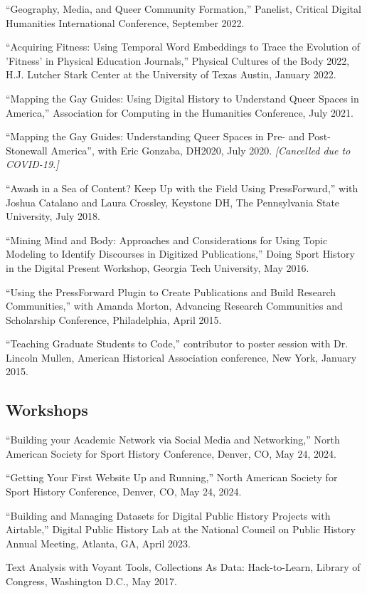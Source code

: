 \documentclass[11pt]{article}
\begin{document}
``Geography, Media, and Queer Community Formation,'' Panelist, Critical Digital Humanities International Conference, September 2022.

``Acquiring Fitness: Using Temporal Word Embeddings to Trace the Evolution of 'Fitness' in Physical Education Journals,'' Physical Cultures of the Body 2022, H.J. Lutcher Stark Center at the University of Texas Austin, January 2022.

``Mapping the Gay Guides: Using Digital History to Understand Queer Spaces in America,'' Association for Computing in the Humanities Conference, July 2021.

``Mapping the Gay Guides: Understanding Queer Spaces in Pre- and Post-Stonewall America'', with Eric Gonzaba, DH2020, July 2020. \emph{[Cancelled due to COVID-19.]}

``Awash in a Sea of Content? Keep Up with the Field Using PressForward,'' with Joshua Catalano and Laura Crossley, Keystone DH, The Pennsylvania State University, July 2018.

``Mining Mind and Body: Approaches and Considerations for Using Topic Modeling to Identify Discourses in Digitized Publications,'' Doing Sport History in the Digital Present Workshop, Georgia Tech University, May 2016.

``Using the PressForward Plugin to Create Publications and Build Research Communities,'' with Amanda Morton, Advancing Research Communities and Scholarship Conference, Philadelphia, April 2015.

``Teaching Graduate Students to Code,'' contributor to poster session with Dr. Lincoln Mullen, American Historical Association conference, New York, January 2015.

\subsection{Workshops}
``Building your Academic Network via Social Media and Networking,'' North American Society for Sport History Conference, Denver, CO, May 24, 2024.

``Getting Your First Website Up and Running,'' North American Society for Sport History Conference, Denver, CO, May 24, 2024.

``Building and Managing Datasets for Digital Public History Projects with Airtable,'' Digital Public History Lab at the National Council on Public History Annual Meeting, Atlanta, GA, April 2023. 

Text Analysis with Voyant Tools, Collections As Data: Hack-to-Learn, Library of Congress, Washington D.C., May 2017.
\end{document}
